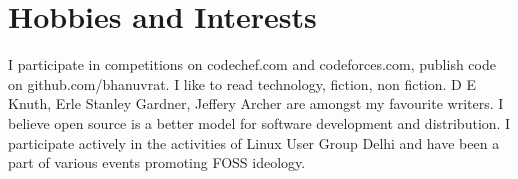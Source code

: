 \section {Hobbies and Interests}
 {I participate in competitions on codechef.com and codeforces.com, publish code on github.com/bhanuvrat.}
 {I like to read technology, fiction, non fiction. D E Knuth, Erle Stanley Gardner, Jeffery Archer are amongst my favourite writers.}
 {I believe open source is a better model for software development and distribution. I participate actively in the activities of Linux User Group Delhi and have been a part of various events promoting FOSS ideology.}
